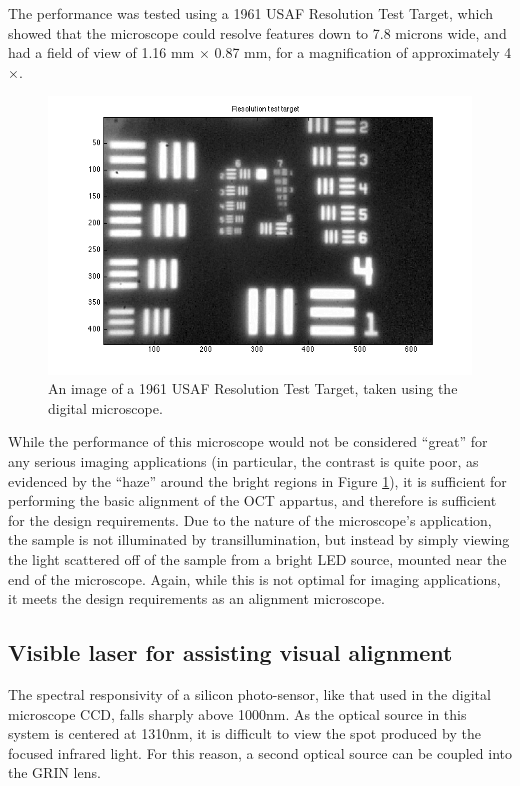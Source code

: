 The performance was tested using a 1961 USAF Resolution Test Target, which showed that the microscope could resolve features down to 7.8 microns wide, and had a field of view of 1.16 mm $\times$ 0.87 mm, for a magnification of approximately 4$\times$.

\begin{figure}[h!]

\centering
\includegraphics[width=1.0\textwidth]{Images/Microscope/target.png}
\caption{An image of a 1961 USAF Resolution Test Target, taken using the digital microscope. \label{fig:usaf}}
\end{figure}

While the performance of this microscope would not be considered ``great'' for any serious imaging applications (in particular, the contrast is quite poor, as evidenced by the ``haze'' around the bright regions in Figure \ref{fig:usaf}), it is sufficient for performing the basic alignment of the OCT appartus, and therefore is sufficient for the design requirements. Due to the nature of the microscope's application, the sample is not illuminated by transillumination, but instead by simply viewing the light scattered off of the sample from a bright LED source, mounted near the end of the microscope. Again, while this is not optimal for imaging applications, it meets the design requirements as an alignment microscope.

\subsection{Visible laser for assisting visual alignment}


The spectral responsivity of a silicon photo-sensor, like that used in the digital microscope CCD, falls sharply above 1000nm. As the optical source in this system is centered at 1310nm, it is difficult to view the spot produced by the focused infrared light. For this reason, a second optical source can be coupled into the GRIN lens.


